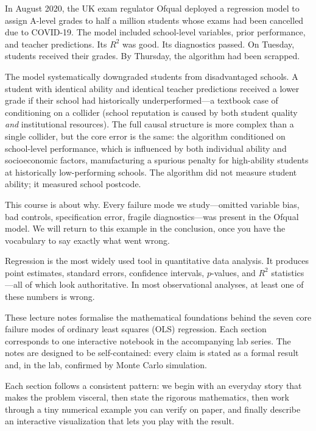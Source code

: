 \documentclass[11pt,a4paper]{article}
\theoremstyle{definition}
\theoremstyle{plain}
\theoremstyle{remark}
\begin{document}
\begin{coldopen}[title={The Algorithm That Ruined 72 Hours}]
In August 2020, the UK exam regulator Ofqual deployed a regression model to assign A-level grades to half a million students whose exams had been cancelled due to COVID-19. The model included school-level variables, prior performance, and teacher predictions. Its $R^2$ was good. Its diagnostics passed. On Tuesday, students received their grades. By Thursday, the algorithm had been scrapped.

The model systematically downgraded students from disadvantaged schools. A student with identical ability and identical teacher predictions received a lower grade if their school had historically underperformed---a textbook case of conditioning on a collider (school reputation is caused by both student quality \emph{and} institutional resources). The full causal structure is more complex than a single collider, but the core error is the same: the algorithm conditioned on school-level performance, which is influenced by both individual ability and socioeconomic factors, manufacturing a spurious penalty for high-ability students at historically low-performing schools. The algorithm did not measure student ability; it measured school postcode.

This course is about why. Every failure mode we study---omitted variable bias, bad controls, specification error, fragile diagnostics---was present in the Ofqual model. We will return to this example in the conclusion, once you have the vocabulary to say exactly what went wrong.
\end{coldopen}

\bigskip

Regression is the most widely used tool in quantitative data analysis.
It produces point estimates, standard errors, confidence intervals, $p$-values, and $R^2$ statistics---all of which look authoritative.
In most observational analyses, at least one of these numbers is wrong.

These lecture notes formalise the mathematical foundations behind the seven core failure modes of ordinary least squares (OLS) regression.
Each section corresponds to one interactive notebook in the accompanying lab series.
The notes are designed to be self-contained: every claim is stated as a formal result and, in the lab, confirmed by Monte Carlo simulation.

Each section follows a consistent pattern: we begin with an everyday story that makes the problem visceral, then state the rigorous mathematics, then work through a tiny numerical example you can verify on paper, and finally describe an interactive visualization that lets you play with the result.
\end{document}
